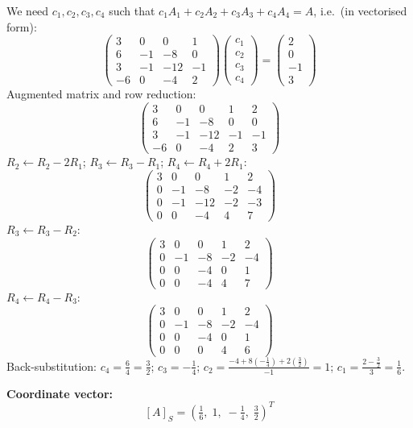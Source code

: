\documentclass[12pt,a3paper]{article}
\begin{document}
\begin{tcolorbox}[enhanced,breakable,colback=cC!4,colframe=cC,
  boxrule=0.8pt,arc=5pt,
  title={\textbf{Answer}},
  fonttitle=\bfseries\color{white},colbacktitle=cC]
We need $c_1,c_2,c_3,c_4$ such that $c_1A_1+c_2A_2+c_3A_3+c_4A_4=A$,
i.e.\ (in vectorised form):
\[
\begin{pmatrix}3&0&0&1\\6&-1&-8&0\\3&-1&-12&-1\\-6&0&-4&2\end{pmatrix}
\begin{pmatrix}c_1\\c_2\\c_3\\c_4\end{pmatrix}
=\begin{pmatrix}2\\0\\-1\\3\end{pmatrix}
\]
Augmented matrix and row reduction:
\[
\left(\begin{array}{cccc|c}
3&0&0&1&2\\6&-1&-8&0&0\\3&-1&-12&-1&-1\\-6&0&-4&2&3
\end{array}\right)
\]
$R_2\leftarrow R_2-2R_1$; $R_3\leftarrow R_3-R_1$; $R_4\leftarrow R_4+2R_1$:
\[
\left(\begin{array}{cccc|c}
3&0&0&1&2\\0&-1&-8&-2&-4\\0&-1&-12&-2&-3\\0&0&-4&4&7
\end{array}\right)
\]
$R_3\leftarrow R_3-R_2$:
\[
\left(\begin{array}{cccc|c}
3&0&0&1&2\\0&-1&-8&-2&-4\\0&0&-4&0&1\\0&0&-4&4&7
\end{array}\right)
\]
$R_4\leftarrow R_4-R_3$:
\[
\left(\begin{array}{cccc|c}
3&0&0&1&2\\0&-1&-8&-2&-4\\0&0&-4&0&1\\0&0&0&4&6
\end{array}\right)
\]
Back-substitution:
$c_4 = \tfrac{6}{4}=\tfrac{3}{2}$;\;
$c_3 = -\tfrac{1}{4}$;\;
$c_2 = \tfrac{-4+8(-\tfrac{1}{4})+2(\tfrac{3}{2})}{-1}=1$;\;
$c_1 = \tfrac{2-\tfrac{3}{2}}{3}=\tfrac{1}{6}$.

\medskip
\textbf{Coordinate vector:}
\[
[A]_S = \left(\tfrac{1}{6},\;1,\;-\tfrac{1}{4},\;\tfrac{3}{2}\right)^T
\]


\end{tcolorbox}
\end{document}
